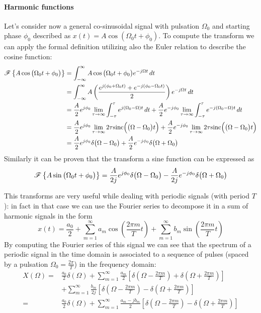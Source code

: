 	\paragraph{Harmonic functions} Let's consider now a general co-sinusoidal signal with pulsation $\Omega_0$ and starting phase $\phi_0$ described as $x(t) = A\cos(\Omega_0 t + \phi_0)$. To compute the transform we can apply the formal definition utilizing also the Euler relation to describe the cosine function:
	\begin{align*}
		\mathscr{F}\left\{ A \cos\big(\Omega_0 t + \phi_0\big) \right\} & = \int_{-\infty}^\infty A  \cos\big(\Omega_0 t + \phi_0\big) e^{-j\Omega t} \, dt \\ 
		& = \int_{-\infty}^\infty A \left( \frac{e^{j(\phi_0 + \Omega_0 t)} + e^{-j(\phi_0 - \Omega_0t)} }{2} \right) e^{-j\Omega t}\, dt \\
		& = \frac A 2 e^{j\phi_0} \lim_{\tau\rightarrow\infty} \int_{-\tau}^\tau e^{j(\Omega_0-\Omega)t}\, dt + \frac A 2 e^{-j\phi_0} \lim_{\tau\rightarrow\infty} \int_{-\tau}^\tau e^{-j(\Omega_0-\Omega)t}\, dt \\
		& = \frac A 2 e^{j\phi_0} \lim_{\tau\rightarrow\infty} 2\tau \textrm{sinc}\Big(\big(\Omega-\Omega_0\big)t\Big) + \frac A 2 e^{-j\phi_0} \lim_{\tau\rightarrow\infty} 2\tau \textrm{sinc}\Big(\big(\Omega-\Omega_0\big)t\Big) \\
		& = \frac A 2 e^{j\phi_0} \delta\big(\Omega - \Omega_0\big) + \frac A 2 e^{-j\phi_0} \delta\big(\Omega + \Omega_0\big)
	\end{align*}
	Similarly it can be proven that the transform a sine function can be expressed as
	\[ \mathscr{F}\left\{ A \sin\big(\Omega_0 t + \phi_0\big) \right\} = \frac{A}{2j} e^{j\phi_0} \delta\big(\Omega-\Omega_0\big) - \frac{A}{2j} e^{-j\phi_0} \delta\big(\Omega+\Omega_0\big) \]
	
	This transforms are very useful while dealing with periodic signals (with period $T$): in fact in that case we can use the Fourier series to decompose it in a sum of harmonic signals in the form
	\[ x(t) = \frac{a_0}{2} + \sum_{m=1}^\infty a_m \cos\left( \frac{2\pi m}{T} t \right) + \sum_{m=1}^\infty b_m \sin\left( \frac{2\pi m}{T} t \right) \]
	By computing the Fourier series of this signal we can see that the spectrum of a periodic signal in the time domain is associated to a sequence of pulses (spaced by a pulsation $\Omega_0 = \frac{2\pi}{T}$) in the frequency domain:
	\begin{align*}
		X(\Omega) = &  \frac{a_0}{2} \delta(\Omega) + \sum_{m=1}^\infty\frac{a_m}{2} \left[ \delta\left(  \Omega - \frac{2\pi m}{T} \right) + \delta\left(  \Omega + \frac{2\pi m}{T} \right)\right] \\ & + \sum_{m=1}^\infty\frac{b_m}{2j} \left[ \delta\left(  \Omega - \frac{2\pi m}{T} \right) - \delta\left(  \Omega + \frac{2\pi m}{T} \right)\right] \\
		= & \frac{a_0}{2} \delta(\Omega) + \sum_{m=1}^{\infty} \frac{a_m - j b_m}{2} \left[ \delta\left(  \Omega - \frac{2\pi m}{T} \right) - \delta\left(  \Omega + \frac{2\pi m}{T} \right)\right] 
	\end{align*}
	
